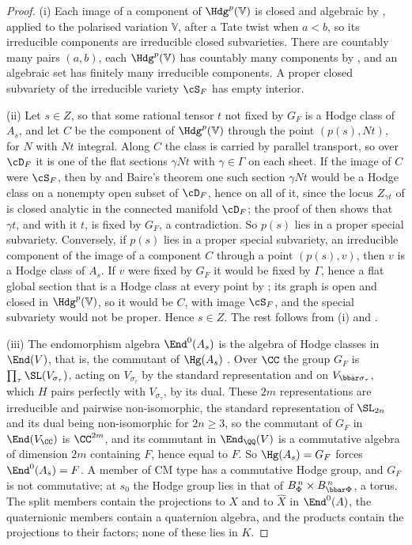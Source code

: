 \begin{proof}
(i) Each image of a component of $\Hdg^{p}(\mathbb{V})$ is closed and
algebraic by , applied to the polarised variation
$\mathbb{V}$, after a Tate twist when $a<b$, so its irreducible
components are irreducible closed subvarieties. There are countably many
pairs $(a,b)$, each $\Hdg^{p}(\mathbb{V})$ has countably many components by
, and an algebraic set has finitely many irreducible
components. A proper closed subvariety of the irreducible variety
$\cS_{F}$ has empty interior.

(ii) Let $s\in Z$, so that some rational tensor $t$ not fixed by $G_{F}$ is a
Hodge class of $A_{s}$, and let $C$ be the component of
$\Hdg^{p}(\mathbb{V})$ through the point $(p(s),Nt)$, for $N$ with $Nt$
integral. Along $C$ the class is carried by parallel transport, so over
$\cD_{F}$ it is one of the flat sections $\gamma Nt$ with $\gamma\in\Gamma$ on
each sheet. If the image of $C$ were $\cS_{F}$, then by 
and Baire's theorem one such section $\gamma Nt$ would be a Hodge class on a
nonempty open subset of $\cD_{F}$, hence on all of it, since the locus
$Z_{\gamma t}$ of  is closed analytic in the connected
manifold $\cD_{F}$; the proof of  then shows that
$\gamma t$, and with it $t$, is fixed by $G_{F}$, a contradiction. So $p(s)$ lies in a proper
special subvariety. Conversely, if $p(s)$ lies in a proper special
subvariety, an irreducible component of the image of a component $C$
through a point $(p(s),v)$, then $v$ is a Hodge class of $A_{s}$. If $v$
were fixed by $G_{F}$ it would be fixed by $\Gamma$, hence a flat global
section that is a Hodge class at every point by ; its
graph is open and closed in $\Hdg^{p}(\mathbb{V})$, so it would be $C$, with
image $\cS_{F}$, and the special subvariety would not be proper. Hence $s\in Z$.
The rest follows from (i) and .

(iii) The endomorphism algebra $\End^{0}(A_{s})$ is the algebra of Hodge
classes in $\End(V)$, that is, the commutant of $\Hg(A_{s})$
\cite[\S3]{Del82}. Over $\CC$ the group $G_{F}$ is
$\prod_{\tau}\SL(V_{\sigma_{\tau}})$, acting on $V_{\sigma_{\tau}}$ by the
standard representation and on $V_{\bbar\sigma_{\tau}}$, which $H$ pairs
perfectly with $V_{\sigma_{\tau}}$, by its dual. These $2m$ representations
are irreducible and pairwise non-isomorphic, the standard representation of
$\SL_{2n}$ and its dual being non-isomorphic for $2n\ge3$, so the commutant
of $G_{F}$ in $\End(V_{\CC})$ is $\CC^{2m}$, and its commutant in
$\End_{\QQ}(V)$ is a commutative algebra of dimension $2m$ containing $F$,
hence equal to $F$. So $\Hg(A_{s})=G_{F}$ forces $\End^{0}(A_{s})=F$. A
member of CM type has a commutative Hodge group, and $G_{F}$ is not
commutative; at $s_{0}$ the Hodge group lies in that of
$B_{\Phi}^{\,n}\times B_{\bbar\Phi}^{\,n}$, a torus. The split members
contain the projections to $X$ and to $\widehat{X}$ in
$\End^{0}(A)$, the quaternionic members contain a quaternion algebra, and
the products contain the projections to their factors; none of these lies
in $K$.


\end{proof}
